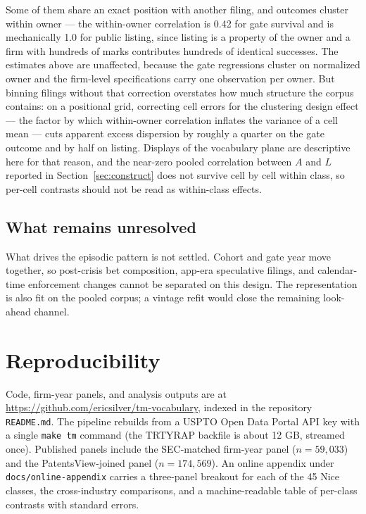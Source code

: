 Some of them share an exact position
with another filing, and outcomes cluster within owner --- the
within-owner correlation is 0.42 for gate survival and is mechanically
1.0 for public listing, since listing is a property of the owner and a
firm with hundreds of marks contributes hundreds of identical successes.
The estimates above are unaffected, because the gate regressions cluster
on normalized owner and the firm-level specifications carry one
observation per owner. But binning filings without that correction
overstates how much structure the corpus contains: on a
positional grid, correcting cell errors for the clustering design effect ---
the factor by which within-owner correlation inflates the variance of a cell
mean --- cuts
apparent excess dispersion by roughly a quarter on the gate outcome and
by half on listing. Displays of the vocabulary plane are descriptive
here for that reason, and the near-zero pooled correlation between $A$ and
$L$ reported in Section~\ref{sec:construct} does not survive cell by cell
within class, so per-cell contrasts should not be read as within-class
effects.

\subsection{What remains unresolved}

What drives the episodic pattern is not settled. Cohort and gate year
move together, so post-crisis bet composition, app-era speculative filings,
and calendar-time enforcement changes cannot be separated on this design.
The representation is also fit on the pooled corpus; a vintage refit would
close the remaining look-ahead channel.

\section{Reproducibility}\label{sec:repro}

\begin{sloppypar}
Code, firm-year panels, and analysis outputs are at
\url{https://github.com/ericsilver/tm-vocabulary}, indexed in the repository
\texttt{README.md}. The pipeline rebuilds from a USPTO Open Data Portal API
key with a single \texttt{make tm} command (the TRTYRAP backfile is about
12 GB, streamed once). Published panels include the SEC-matched firm-year
\dkl{} panel ($n = 59{,}033$) and the PatentsView-joined panel
($n = 174{,}569$). An online appendix under
\texttt{docs/online-appendix} carries a three-panel breakout for each of the
45 Nice classes, the cross-industry comparisons, and a machine-readable
table of per-class contrasts with standard errors.
\end{sloppypar}


